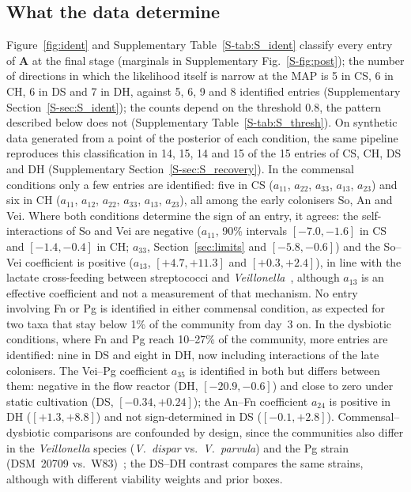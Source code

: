 \documentclass[preprint,12pt]{elsarticle}
\begin{document}
\subsection{What the data determine}
Figure~\ref{fig:ident} and Supplementary Table~\ref{S-tab:S_ident} classify every entry of $\mathbf{A}$ at the final stage (marginals in Supplementary Fig.~\ref{S-fig:post}); the number of directions in which the likelihood itself is narrow at the MAP is 5 in CS, 6 in CH, 6 in DS and 7 in DH, against 5, 6, 9 and 8 identified entries (Supplementary Section~\ref{S-sec:S_ident}); the counts depend on the threshold 0.8, the pattern described below does not (Supplementary Table~\ref{S-tab:S_thresh}). On synthetic data generated from a point of the posterior of each condition, the same pipeline reproduces this classification in 14, 15, 14 and 15 of the 15 entries of CS, CH, DS and DH (Supplementary Section~\ref{S-sec:S_recovery}).
In the commensal conditions only a few entries are identified: five in CS ($a_{11}$, $a_{22}$, $a_{33}$, $a_{13}$, $a_{23}$) and six in CH ($a_{11}$, $a_{12}$, $a_{22}$, $a_{33}$, $a_{13}$, $a_{23}$), all among the early colonisers So, An and Vei.
Where both conditions determine the sign of an entry, it agrees: the self-interactions of So and Vei are negative ($a_{11}$, 90\% intervals $[-7.0,-1.6]$ in CS and $[-1.4,-0.4]$ in CH; $a_{33}$, Section~\ref{sec:limits} and $[-5.8,-0.6]$) and the So--Vei coefficient is positive ($a_{13}$, $[+4.7,+11.3]$ and $[+0.3,+2.4]$), in line with the lactate cross-feeding between streptococci and \textit{Veillonella}~\citep{Kolenbrander2010OralMultispecies}, although $a_{13}$ is an effective coefficient and not a measurement of that mechanism.
No entry involving Fn or Pg is identified in either commensal condition, as expected for two taxa that stay below 1\% of the community from day~3 on.
In the dysbiotic conditions, where Fn and Pg reach 10--27\% of the community, more entries are identified: nine in DS and eight in DH, now including interactions of the late colonisers.
The Vei--Pg coefficient $a_{35}$ is identified in both but differs between them: negative in the flow reactor (DH, $[-20.9,-0.6]$) and close to zero under static cultivation (DS, $[-0.34,+0.24]$); the An--Fn coefficient $a_{24}$ is positive in DH ($[+1.3,+8.8]$) and not sign-determined in DS ($[-0.1,+2.8]$).
Commensal--dysbiotic comparisons are confounded by design, since the communities also differ in the \textit{Veillonella} species (\textit{V.~dispar} vs.\ \textit{V.~parvula}) and the Pg strain (DSM~20709 vs.\ W83)~\citep{heine2025influence}; the DS--DH contrast compares the same strains, although with different viability weights and prior boxes.
\end{document}

